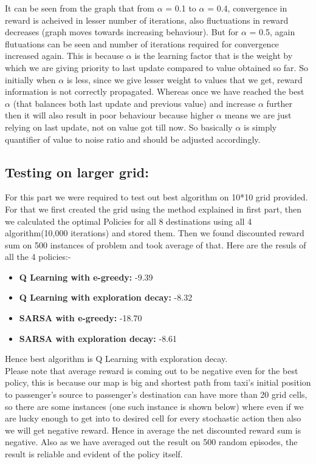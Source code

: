 \documentclass{article}
\begin{document}
\begin{enumerate}[a)]
\begin{enumerate}
    It can be seen from the graph that from $\alpha$ = 0.1 to $\alpha$ = 0.4, convergence in reward is acheived in lesser number of iterations, also fluctuations in reward decreases  (graph moves towards increasing behaviour). But for 
    $\alpha$ = 0.5, again flutuations can be seen and number of iterations required for convergence increased again. This is because $\alpha$ is the learning factor that is the weight by which we are giving priority to last update compared to value 
    obtained so far. So initially when $\alpha$ is less, since we give lesser weight to values that we get, reward information is not correctly propagated. Whereas once we have reached the best $\alpha$ (that balances both last update and 
    previous value) and increase $\alpha$ further then it will also result in poor behaviour because higher $\alpha$ means we are just relying on last update, not on value got till now. So basically $\alpha$ is simply quantifier of value to noise ratio and should be adjusted accordingly.

    
\end{enumerate}


\subsection{Testing on larger grid:}
For this part we were required to test out best algorithm on 10*10 grid provided. For that we first created the grid using the method explained in first part, then we calculated the optimal Policies for all 8 destinations using all 4 algorithm(10,000 iterations) and stored them. Then we found discounted reward sum on 500 instances of problem and took average of that.
Here are the resuls of all the 4 policies:- 
\begin{itemize}
    \item \textbf{Q Learning with e-greedy: } -9.39
    \item \textbf{Q Learning with exploration decay: }  -8.32
    \item \textbf{SARSA with e-greedy: }  -18.70
    \item \textbf{SARSA with exploration decay: } -8.61
\end{itemize}

Hence best algorithm is Q Learning with exploration decay.\\

Please note that average reward is coming out to be negative even for the best policy, this is because our map is big and shortest path from taxi's initial position to passenger's source to passenger's destination can have
more than 20 grid cells, so there are some instances (one such instance is shown below) where even if we are lucky enough to get into to desired cell for every stochastic action then also we will get negative reward. Hence in average the net discounted reward sum is negative.
Also as we have averaged out the result on 500 random episodes, the result is reliable and evident of the policy itself.



\end{enumerate}
\end{document}
